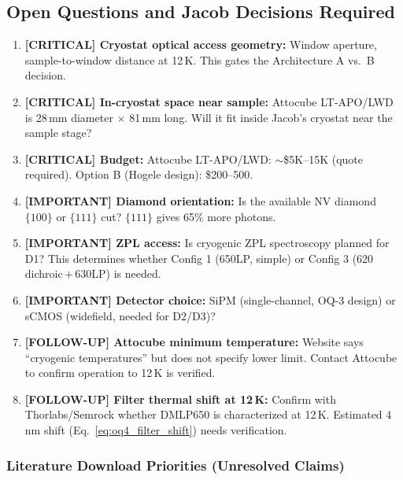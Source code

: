 \subsection{Open Questions and Jacob Decisions Required}
\label{sec:oq4_openquestions}

\begin{enumerate}
  \item \textbf{[CRITICAL] Cryostat optical access geometry:}
    Window aperture, sample-to-window distance at 12\,K. This gates the
    Architecture A vs.\ B decision.
  \item \textbf{[CRITICAL] In-cryostat space near sample:}
    Attocube LT-APO/LWD is 28\,mm diameter $\times$ 81\,mm long. Will
    it fit inside Jacob's cryostat near the sample stage?
  \item \textbf{[CRITICAL] Budget:}
    Attocube LT-APO/LWD: $\sim$\$5K--15K (quote required).
    Option B (Hogele design): \$200--500.
  \item \textbf{[IMPORTANT] Diamond orientation:}
    Is the available NV diamond $\{100\}$ or $\{111\}$ cut?
    $\{111\}$ gives 65\% more photons.\cite{Hopper2018}
  \item \textbf{[IMPORTANT] ZPL access:}
    Is cryogenic ZPL spectroscopy planned for D1? This determines whether
    Config 1 (650LP, simple) or Config 3 (620 dichroic\,$+$\,630LP) is needed.
  \item \textbf{[IMPORTANT] Detector choice:}
    SiPM (single-channel, OQ-3 design) or sCMOS (widefield, needed for D2/D3)?
  \item \textbf{[FOLLOW-UP] Attocube minimum temperature:}
    Website says ``cryogenic temperatures'' but does not specify lower limit.
    Contact Attocube to confirm operation to 12\,K is verified.
  \item \textbf{[FOLLOW-UP] Filter thermal shift at 12\,K:}
    Confirm with Thorlabs/Semrock whether DMLP650 is characterized at 12\,K.
    Estimated 4\,nm shift (Eq.~\ref{eq:oq4_filter_shift}) needs verification.
\end{enumerate}

\subsubsection{Literature Download Priorities (Unresolved Claims)}

